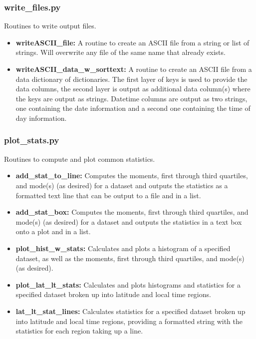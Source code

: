 \subsubsection{write\_files.py}

Routines to write output files.

\begin{itemize}
\item[]{\bf writeASCII\_file: } A routine to create an ASCII file from a string or list of strings.  Will overwrite any file of the same name that already exists.
\item[]{\bf writeASCII\_data\_w\_sorttext: } A routine to create an ASCII file from a data dictionary of dictionaries.  The first layer of keys is used to provide the data columns, the second layer is output as additional data column(s) where the keys are output as strings.  Datetime columns are output as two strings, one containing the date information and a second one containing the time of day information.
\end{itemize}

\subsubsection{plot\_stats.py}

Routines to compute and plot common statistics.

\begin{itemize}
\item[]{\bf add\_stat\_to\_line: } Computes the moments, first through third quartiles, and mode(s) (as desired) for a dataset and outputs the statistics as a formatted text line that can be output to a file and in a list.
\item[]{\bf add\_stat\_box: } Computes the moments, first through third quartiles, and mode(s) (as desired) for a dataset and outputs the statistics in a text box onto a plot and in a list.
\item[]{\bf plot\_hist\_w\_stats: } Calculates and plots a histogram of a specified dataset, as well as the moments, first through third quartiles, and mode(s) (as desired).
\item[]{\bf plot\_lat\_lt\_stats: } Calculates and plots histograms and statistics for a specified dataset broken up into latitude and local time regions.
\item[]{\bf lat\_lt\_stat\_lines: } Calculates statistics for a specified dataset broken up into latitude and local time regions, providing a formatted string with the statistics for each region taking up a line.
\end{itemize}

